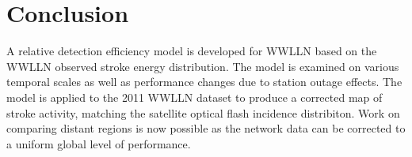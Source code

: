 
\section{Conclusion}

A relative detection efficiency model is developed for WWLLN based on the WWLLN observed stroke energy distribution.
The model is examined on various temporal scales as well as performance changes due to station outage effects.
The model is applied to the 2011 WWLLN dataset to produce a corrected map of stroke activity, matching the satellite optical flash incidence distribiton.
Work on comparing distant regions is now possible as the network data can be corrected to a uniform global level of performance.
